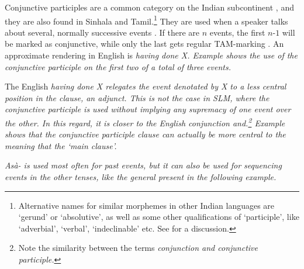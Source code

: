 Conjunctive participles are a common category on the Indian subcontinent \citep{Bloch1934,Emeneau1956,Masica1976}, and they are also found in Sinhala and Tamil.\footnote{Alternative
 names for similar morphemes in other Indian languages are `gerund' or `absolutive', as well as some other qualifications of `participle', like `adverbial', `verbal', `indeclinable' etc. See \citet[110]{Masica1976} for a discussion.}
They are used when a speaker talks about several, normally successive events . If there are $n$ events, the first $n$-$1$ will be marked as conjunctive, while only the last gets regular TAM-marking \citep[cf.][]{Slomanson2008lingua}. An approximate rendering in English is \em having done X\em. Example   shows the use of the conjunctive participle on the first two of a total of three events.
 
 
 
The English \em having done X \em relegates the event denotated by X to a less central position in the clause, an adjunct. This is not the case in SLM, where the conjunctive participle is used without implying any supremacy of one event over the other. In this regard, it is closer to the English conjunction \em and\em.\footnote{Note the similarity between the terms \em conjunction \em and \em conjunctive participle\em.} Example   shows that the conjunctive participle clause can actually be more central to the meaning that the `main clause'.


\em Asà- \em is used most often for past events, but it can also be used for sequencing events in the other tenses, like the general present in the following example.

